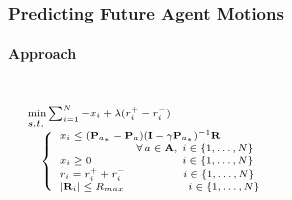 \begin{frame}
	\frametitle{Predicting Future Agent Motions}
	\framesubtitle{Approach}
	
	\vspace{-0.1cm}
	
	\begin{columns}[T]
		
		\vspace{-0.2cm}
		
		\begin{equation*}
			\hspace{0.3cm}
			\scriptsize
			\begin{array}{ll}
				\min \sum\nolimits_{i=1}^N -x_i + \lambda (r_i^+ - r_i^-)
				\vspace{-0.35cm} \\ \\
				s.t. \\ \;\;\;\;
				\left \{
					\begin{array}{ll}
						x_i \leq (\mathbf{P}_{a_*} - \mathbf{P}_a)(\mathbf{I} - \gamma
						\mathbf{P}_{a_*})^{-1} \mathbf{R} \\
						\vspace{-0.25cm} \\
						\;\;\;\;\;\;\;\;\;\;\;\;\;\;\;\;\;\;\;\;\;
						\;\;\; \forall \, a \in \mathbf{A}, \; i \in \{ 1, \ldots, N \}
						\vspace{-0.25cm}\\ \\
						x_i \geq 0 \;\;\;\;\;\;\,\,\,\,\;\;\;\,\,\,\,\,\;\,\,\,\,\,\,\,\;\;\;\;\;
						\;\,\,\,\,\, i \in \{ 1, \ldots, N \}
						\vspace{-0.25cm} \\ \\
						r_i = r_i^+ + r_i^- \;\,\,\,\,\,\;\,\,\,\,\,\,\,\;\;\;\;\;
						\;\,\,\,\,\, i \in \{ 1, \ldots, N \}
						\vspace{-0.25cm}
						\\ \\
						| \mathbf{R}_i | \leq R_{max} \;\;\;\;\;\;\;\;\;\;\;\,\,\,\,\;\;\
						\,\,\,\,\,\, i \in \{ 1, \ldots, N \}
					\end{array}
				\right.
				\vspace{0.2cm}
			\end{array}
		\end{equation*}
		
		\tiny
		
		\vspace{-0.8cm}
		

\end{columns}
\end{frame}
